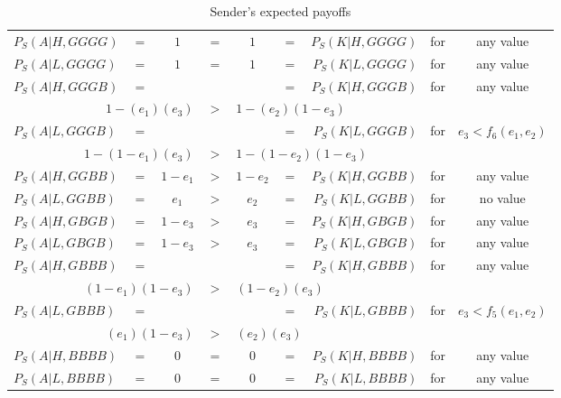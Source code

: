 \documentclass[a4paper,12pt]{article}
\numberwithin{equation}{section}
\begin{document}
\begin{table}[h]
\begin{center}
\setlength{\tabcolsep}{.45em}
\begin{tabular}{lcccccrcc}
$P_{S}(A|H,GGGG)$ & $=$ & $1$ & $=$ & $1$ & = & $P_{S}(K|H,GGGG)$ & for & any value\\
$P_{S}(A|L,GGGG)$ & $=$ & $1$ & $=$ & $1$ & = & $P_{S}(K|L,GGGG)$ & for & any value\\
$P_{S}(A|H,GGGB)$ & $=$ & \hspace{10mm} & & \hspace{10mm} & $=$ & $P_{S}(K|H,GGGB)$ & \multirow{2}{*}{for} & \multirow{2}{*}{ any value}
\vspace{-1mm}\\
\multicolumn{3}{r}{$1-(e_{1})(e_{3})$} & $>$ & \multicolumn{3}{l}{$1-(e_{2})(1-e_{3})$} &
\vspace{1mm}\\
$P_{S}(A|L,GGGB)$ & $=$ & & & & $=$ & $P_{S}(K|L,GGGB)$ & \multirow{2}{*}{for} & \multirow{2}{*}{$e_{3}<f_{6}(e_{1},e_{2})$}
\vspace{-1mm}\\
\multicolumn{3}{r}{$1-(1-e_{1})(e_{3})$} & $>$ & \multicolumn{3}{l}{$1-(1-e_{2})(1-e_{3})$} &
\vspace{1mm}\\
$P_{S}(A|H,GGBB)$ & $=$ & $1-e_{1}$ & $>$ & $1-e_{2}$ & = & $P_{S}(K|H,GGBB)$ & for & any value\\
$P_{S}(A|L,GGBB)$ & $=$ & $e_{1}$ & $>$ & $e_{2}$ & = & $P_{S}(K|L,GGBB)$ & for & no value\\
$P_{S}(A|H,GBGB)$ & $=$ & $1-e_{3}$ & $>$ & $e_{3}$ & = & $P_{S}(K|H,GBGB)$ & for & any value\\
$P_{S}(A|L,GBGB)$ & $=$ & $1-e_{3}$ & $>$ & $e_{3}$ & = & $P_{S}(K|L,GBGB)$ & for & any value\\
$P_{S}(A|H,GBBB)$ & $=$ & & & & $=$ & $P_{S}(K|H,GBBB)$ & \multirow{2}{*}{for} & \multirow{2}{*}{ any value}
\vspace{-1mm}\\
\multicolumn{3}{r}{$(1-e_{1})(1-e_{3})$} & $>$ & \multicolumn{3}{l}{$(1-e_{2})(e_{3})$} &
\vspace{1mm}\\
$P_{S}(A|L,GBBB)$ & $=$ & & & & $=$ & $P_{S}(K|L,GBBB)$ & \multirow{2}{*}{for} & \multirow{2}{*}{$e_{3}<f_{5}(e_{1},e_{2})$}
\vspace{-1mm}\\
\multicolumn{3}{r}{$(e_{1})(1-e_{3})$} & $>$ & \multicolumn{3}{l}{$(e_{2})(e_{3})$} &
\vspace{1mm}\\
$P_{S}(A|H,BBBB)$ & $=$ & $0$ & $=$ & $0$ & = & $P_{S}(K|H,BBBB)$ & for & any value\\
$P_{S}(A|L,BBBB)$ & $=$ & $0$ & $=$ & $0$ & = & $P_{S}(K|L,BBBB)$ & for & any value
\end{tabular}
\end{center}
\caption{Sender's expected payoffs}
\label{tab:CueGamewithObservableAmplification/ConditionalPayoffsS}
\end{table}
\end{document}
